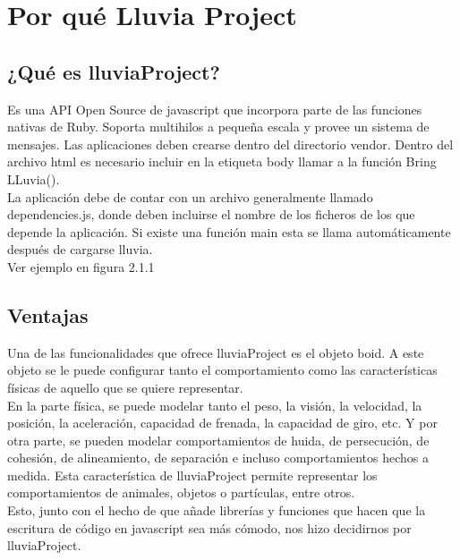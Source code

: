 \section{Por qué Lluvia Project}
\label{section:por_que}

\subsection{¿Qué es lluviaProject?}
\label{subsection:que_es}

Es una API Open Source de javascript  que incorpora parte de las funciones nativas de Ruby. Soporta multihilos a pequeña escala y provee un 
sistema de mensajes. Las aplicaciones deben crearse dentro del directorio vendor. Dentro del archivo html es necesario incluir en la 
etiqueta body llamar a la función Bring LLuvia().\\

La aplicación debe de contar con un archivo generalmente llamado dependencies.js, donde deben incluirse el nombre de los ficheros de los que 
depende la aplicación. Si existe una función main esta se llama automáticamente después de cargarse lluvia.\\

Ver ejemplo en figura 2.1.1


\subsection{Ventajas}
\label{subsection:ventajas}


Una de las funcionalidades que ofrece lluviaProject es el objeto boid. A este objeto se le puede configurar tanto el comportamiento como las 
características físicas de aquello que se quiere representar.\\

En la parte física, se puede modelar tanto el peso, la visión, la velocidad, la posición, la aceleración, capacidad de frenada, la capacidad 
de giro, etc. Y por otra parte, se pueden modelar comportamientos de huida, de persecución, de cohesión, de alineamiento, de separación e 
incluso comportamientos hechos a medida. Esta característica de lluviaProject permite representar los comportamientos de animales, objetos 
o partículas, entre otros.\\

Esto, junto con el hecho de que añade librerías y funciones que hacen que la escritura de código en javascript sea más cómodo, nos hizo 
decidirnos por lluviaProject.\\


